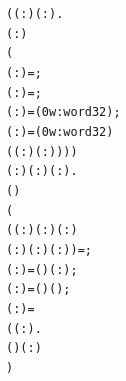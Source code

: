 \documentclass{article}
\begin{document}
\begin{alltt}
\HOLTokenTurnstile{} (\HOLSymConst{\HOLTokenForall{}}( :) ( :).
       ( :)   \HOLSymConst{=}
      (
         ( : ) =  ;
         ( : ) =  ;
         ( :) = (0w :word32);
         ( :) = (0w :word32)
         (\HOLSymConst{,}\HOLSymConst{,}\HOLSymConst{,}\HOLSymConst{,}( :)\HOLSymConst{,}( :)))) \HOLSymConst{\HOLTokenConj{}}
   \HOLSymConst{\HOLTokenForall{}}( :) ( :) ( :).
      ( )   \HOLSymConst{=}
     (
        (( :)\HOLSymConst{,}( :)\HOLSymConst{,}( : )\HOLSymConst{,}
           ( : )\HOLSymConst{,}( :)\HOLSymConst{,}( :)) =    ;
        ( :) = (   \HOLSymConst{\ensuremath{+}}  \HOLSymConst{\ensuremath{+}} ) \HOLSymConst{\HOLTokenRol{}} ( :);
        ( :) = (   \HOLSymConst{\ensuremath{+}}  \HOLSymConst{\ensuremath{+}} ) \HOLSymConst{\HOLTokenRol{}}  ( \HOLSymConst{\ensuremath{+}} );
        ( : ) =
            (\HOLTokenLambda{}( :).
                   \HOLSymConst{=}   (   \HOLSymConst{\ensuremath{+}}  \HOLSymConst{\ensuremath{+}} ) \HOLSymConst{\HOLTokenRol{}} ( :)
                    )

\end{alltt}
\end{document}
